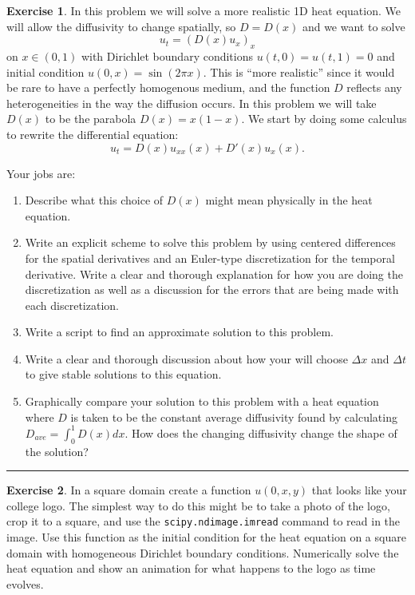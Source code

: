 \documentclass[
]{book}
\theoremstyle{definition}
\theoremstyle{definition}
\theoremstyle{definition}
\newtheorem{exercise}{Exercise}[chapter]
\theoremstyle{remark}
\begin{document}
\begin{exercise}
\protect\hypertarget{exr:unnamed-chunk-614}{}{\label{exr:unnamed-chunk-614} }In this problem we will solve a more realistic 1D heat equation. We will
allow the diffusivity to change spatially, so \(D = D(x)\) and we want to
solve \[u_t = \left( D(x) u_x \right)_x\] on \(x \in (0,1)\) with
Dirichlet boundary conditions \(u(t,0) = u(t,1) = 0\) and initial
condition \(u(0,x) = \sin(2 \pi x)\). This is ``more realistic'' since it
would be rare to have a perfectly homogenous medium, and the function
\(D\) reflects any heterogeneities in the way the diffusion occurs. In
this problem we will take \(D(x)\) to be the parabola \(D(x)= x(1-x)\). We
start by doing some calculus to rewrite the differential equation:
\[u_t = D(x) u_{xx}(x) + D'(x) u_x(x).\]

Your jobs are:

\begin{enumerate}
\def\labelenumi{\alph{enumi}.}
\item
  Describe what this choice of \(D(x)\) might mean physically in the
  heat equation.
\item
  Write an explicit scheme to solve this problem by using centered
  differences for the spatial derivatives and an Euler-type
  discretization for the temporal derivative. Write a clear and
  thorough explanation for how you are doing the discretization as
  well as a discussion for the errors that are being made with each
  discretization.
\item
  Write a script to find an approximate solution to this problem.
\item
  Write a clear and thorough discussion about how your will choose
  \(\Delta x\) and \(\Delta t\) to give stable solutions to this equation.
\item
  Graphically compare your solution to this problem with a heat
  equation where \(D\) is taken to be the constant average diffusivity
  found by calculating \(D_{ave} = \int_0^1 D(x) dx.\) How does the
  changing diffusivity change the shape of the solution?
\end{enumerate}
\end{exercise}

\begin{center}\rule{0.5\linewidth}{0.5pt}\end{center}

\begin{exercise}
\protect\hypertarget{exr:unnamed-chunk-615}{}{\label{exr:unnamed-chunk-615} }In a square domain create a function \(u(0,x,y)\) that looks like your
college logo. The simplest way to do this might be to take a photo of
the logo, crop it to a square, and use the \texttt{scipy.ndimage.imread} command to read in the image.
Use this function as the initial condition for the heat equation on a
square domain with homogeneous Dirichlet boundary conditions.
Numerically solve the heat equation and show an animation for what
happens to the logo as time evolves.
\end{exercise}
\end{document}
